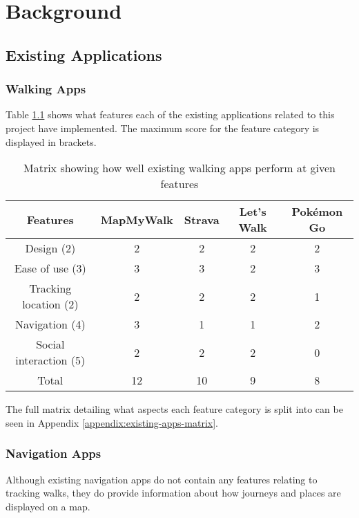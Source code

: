 \chapter{Background}



\section{Existing Applications}

\subsection{Walking Apps}


Table \ref{table:existing-walking-apps} shows what features each of the existing applications related to this project have implemented. The maximum score for the feature category is displayed in brackets.

\begin{table}[h]
  \centering
  \begin{tabular}{|c||c|c|c|c|}
    \hline
    Features & MapMyWalk & Strava & Let's Walk & Pok\'{e}mon Go\\
    \hline
    \hline
    Design (2) & 2 & 2 & 2 & 2\\
    \hline
    Ease of use (3) & 3 & 3 & 2 & 3\\
    \hline
    Tracking location (2) & 2 & 2 & 2 & 1\\
    \hline
    Navigation (4) & 3 & 1 & 1 & 2\\
    \hline
    Social interaction (5) & 2 & 2 & 2 & 0\\
    \hline
    \hline
    Total & 12 & 10 & 9 & 8\\
    \hline
  \end{tabular}
  \caption{Matrix showing how well existing walking apps perform at given features}
  \label{table:existing-walking-apps}
\end{table}

The full matrix detailing what aspects each feature category is split into can be seen in Appendix \ref{appendix:existing-apps-matrix}.

\subsection{Navigation Apps}

Although existing navigation apps do not contain any features relating to tracking walks, they do provide information about how journeys and places are displayed on a map.

